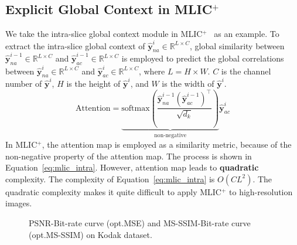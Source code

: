 \documentclass{article}
\theoremstyle{plain}
\theoremstyle{definition}
\theoremstyle{remark}
\begin{document}
  \subsection{Explicit Global Context in MLIC$^+$}
  \label{sec:method:ggc_mlicp}
  We take the intra-slice global context module in MLIC$^+$~\cite{jiang2022mlic} as an example.
  To extract the intra-slice global context of $\hat{\boldsymbol{y}}_{na}^i \in \mathbb{R}^{L\times C}$,
  global similarity between $\hat{\boldsymbol{y}}^{i-1}_{na} \in \mathbb{R}^{L\times C}$
  and $\hat{\boldsymbol{y}}^{i-1}_{ac} \in \mathbb{R}^{L\times C}$ is employed to predict the global correlations
  between $\hat{\boldsymbol{y}}^i_{na} \in \mathbb{R}^{L\times C}$ and $\hat{\boldsymbol{y}}^i_{ac} \in \mathbb{R}^{L\times C}$,
  where $L=H\times W$.
  $C$ is the channel number of $\hat{\boldsymbol{y}}^i$, $H$ is 
  the height of $\hat{\boldsymbol{y}}^i$, and $W$ is the width of $\hat{\boldsymbol{y}}^i$.
  \begin{equation}
    \textrm{Attention} = \underbrace{\textrm{softmax}\left(\frac{\hat{\boldsymbol{y}}^{i-1}_{na}    \left(\hat{\boldsymbol{y}}^{i-1}_{ac}\right)^{\top} }{\sqrt{d_k}}\right)}_{\textrm{non-negative}}\hat{\boldsymbol{y}}^i_{ac}
    \label{eq:mlic_intra}
\end{equation}
  In MLIC$^+$\cite{jiang2022mlic}, the attention map is employed 
  as a similarity metric, because of the non-negative property of the attention map.
  The process is shown in Equation~\ref{eq:mlic_intra}.
  However, attention map leads to \textbf{quadratic} complexity.
  The complexity of Equation~\ref{eq:mlic_intra} is $O(CL^2)$.
  The quadratic complexity makes it quite difficult to apply MLIC$^+$ to high-resolution images.
  \begin{figure*}
    \centering
    \caption{PSNR-Bit-rate curve (opt.MSE) and MS-SSIM-Bit-rate curve (opt.MS-SSIM) on Kodak dataset.}
    \label{fig:rd}
  \end{figure*}
\end{document}
